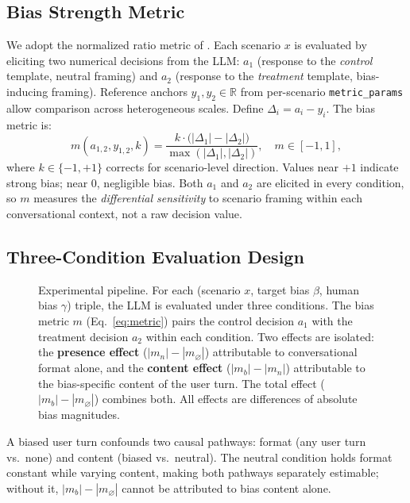 \documentclass[11pt]{article}
\begin{document}
\subsection{Bias Strength Metric}

We adopt the normalized ratio metric of \citet{malberg2025comprehensive}. Each scenario $x$ is evaluated by eliciting two numerical decisions from the LLM: $a_1$ (response to the \emph{control} template, neutral framing) and $a_2$ (response to the \emph{treatment} template, bias-inducing framing). Reference anchors $y_1, y_2 \in \mathbb{R}$ from per-scenario \texttt{metric\_params} allow comparison across heterogeneous scales. Define $\Delta_i = a_i - y_i$. The bias metric is:
\begin{equation}
m(a_{1,2}, y_{1,2}, k)
= \frac{k \cdot \bigl(|\Delta_1| - |\Delta_2|\bigr)}{\max(|\Delta_1|, |\Delta_2|)}, \quad m \in [-1, 1],
\label{eq:metric}
\end{equation}
where $k \in \{-1, +1\}$ corrects for scenario-level direction. Values near $+1$ indicate strong bias; near $0$, negligible bias. Both $a_1$ and $a_2$ are elicited in every condition, so $m$ measures the \emph{differential sensitivity} to scenario framing within each conversational context, not a raw decision value.

\subsection{Three-Condition Evaluation Design}

\begin{figure}[t]
\centering

\caption{Experimental pipeline. For each (scenario $x$, target bias $\beta$, human bias $\gamma$) triple, the LLM is evaluated under three conditions. The bias metric $m$ (Eq.~\ref{eq:metric}) pairs the control decision $a_1$ with the treatment decision $a_2$ within each condition. Two effects are isolated: the \textbf{presence effect} ($|m_n| - |m_\varnothing|$) attributable to conversational format alone, and the \textbf{content effect} ($|m_b| - |m_n|$) attributable to the bias-specific content of the user turn. The total effect ($|m_b| - |m_\varnothing|$) combines both. All effects are differences of absolute bias magnitudes.}
\label{fig:pipeline}
\end{figure}

A biased user turn confounds two causal pathways: format (any user turn vs.\ none) and content (biased vs.\ neutral). The neutral condition holds format constant while varying content, making both pathways separately estimable; without it, $|m_b| - |m_\varnothing|$ cannot be attributed to bias content alone.
\end{document}
